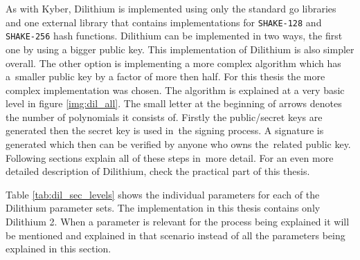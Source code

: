 As with Kyber, Dilithium is implemented using only the standard go libraries and one external library \cite{00fV2cvg7Z6H2tS3} that contains implementations for \texttt{SHAKE-128} and \texttt{SHAKE-256} hash functions. Dilithium can be implemented in two ways, the first one by using a bigger public key. This implementation of Dilithium is also simpler overall. The other option is implementing a more complex algorithm which has a~smaller public key by a factor of more then half. For this thesis the more complex implementation was chosen. The algorithm is explained at a very basic level in figure \ref{img:dil_all}. The small letter at the beginning of arrows denotes the number of polynomials it consists of. Firstly the public/secret keys are generated then the secret key is used in~the signing process. A signature is generated which then can be verified by anyone who owns the~related public key. Following sections explain all of these steps in~more detail. For an even more detailed description of Dilithium, check the practical part of this thesis.


Table \ref{tab:dil_sec_levels} shows the individual parameters for each of the Dilithium parameter sets. The implementation in this thesis contains only Dilithium 2. When a parameter is relevant for the process being explained it will be mentioned and explained in that scenario instead of all the parameters being explained in this section.
